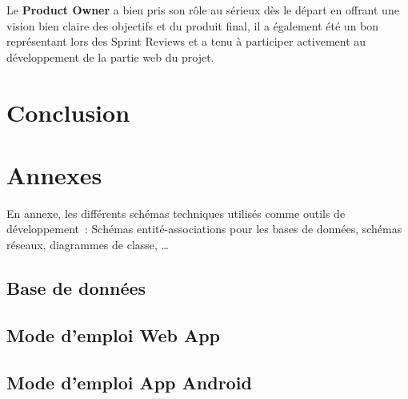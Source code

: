 \documentclass{report}
\begin{document}
		Le \textbf{Product Owner} a bien pris son rôle au sérieux dès le départ en offrant une vision bien claire des objectifs et du produit final, il a également été un bon représentant lors des Sprint Reviews et a tenu à participer activement au développement de la partie web du projet.\\

\chapter{Conclusion}

\chapter{Annexes} %
	

	En annexe, les différents schémas techniques utilisés comme outils de développement : Schémas entité-associations pour les bases de données, schémas réseaux, diagrammes de classe, …

	\section{Base de données}

	\section{Mode d'emploi Web App}

	\section{Mode d'emploi App Android}
\end{document}
